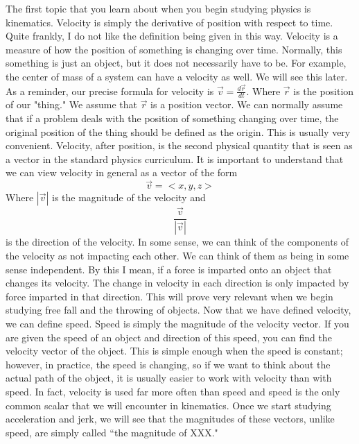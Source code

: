 \vspace{5mm}
\newline

The first topic that you learn about when you begin studying physics is kinematics. Velocity is simply the derivative of position with respect to time. Quite frankly, I do not like the definition being given in this way. Velocity is a measure of how the position of something is changing over time. Normally, this something is just an object, but it does not necessarily have to be. For example, the center of mass of a system can have a velocity as well. We will see this later. As a reminder, our precise formula for velocity is $ \vec{v}= \frac{d\vec{r}}{dt}$. Where $\vec{r}$ is the position of our "thing." We assume that $\vec{r}$ is a position vector. We can normally assume that if a problem deals with the position of something changing over time, the original position of the thing should be defined as the origin. This is usually very convenient. Velocity, after position, is the second physical quantity that is seen as a vector in the standard physics curriculum. It is important to understand that we can view velocity in general as a vector of the form \begin{equation} \vec{v}= <x,y,z>\end{equation} Where $|\vec{v}|$ is the magnitude of the velocity and \begin{equation}\frac{\vec{v}}{|\vec{v}|}\end{equation} is the direction of the velocity. In some sense, we can think of the components of the velocity as not impacting each other. We can think of them as being in some sense independent. By this I mean, if a force is imparted onto an object that changes its velocity. The change in velocity in each direction is only impacted by force imparted in that direction. This will prove very relevant when we begin studying free fall and the throwing of objects. Now that we have defined velocity, we can define speed. Speed is simply the magnitude of the velocity vector. If you are given the speed of an object and direction of this speed, you can find the velocity vector of the object. This is simple enough when the speed is constant; however, in practice, the speed is changing, so if we want to think about the actual path of the object, it is usually easier to work with velocity than with speed. In fact, velocity is used far more often than speed and speed is the only common scalar that we will encounter in kinematics. Once we start studying acceleration and jerk, we will see that the magnitudes of these vectors, unlike speed, are simply called “the magnitude of XXX." 
\clearpage
